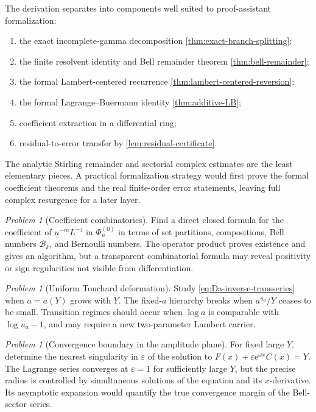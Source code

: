 \documentclass[11pt]{article}
\numberwithin{equation}{section}
\theoremstyle{mainthm}
\theoremstyle{defstyle}
\theoremstyle{remark}
\newtheorem{problem}[theorem]{Problem}
\newcommand{\e}{\mathrm e}
\newcommand{\Bell}{\mathcal B}
\begin{document}
The derivation separates into components well suited to proof-assistant formalization:
\begin{enumerate}
\item the exact incomplete-gamma decomposition \cref{thm:exact-branch-splitting};
\item the finite resolvent identity and Bell remainder theorem \cref{thm:bell-remainder};
\item the formal Lambert-centered recurrence \cref{thm:lambert-centered-reversion};
\item the formal Lagrange--Buermann identity \cref{thm:additive-LB};
\item coefficient extraction in a differential ring;
\item residual-to-error transfer by \cref{lem:residual-certificate}.
\end{enumerate}
The analytic Stirling remainder and sectorial complex estimates are the least elementary pieces.  A practical formalization strategy would first prove the formal coefficient theorems and the real finite-order error statements, leaving full complex resurgence for a later layer.

\begin{problem}[Coefficient combinatorics]
Find a direct closed formula for the coefficient of \(u^{-m}L^{-j}\) in \(\Phi_n^{(0)}\) in terms of set partitions, compositions, Bell numbers \(\Bell_k\), and Bernoulli numbers.  The operator product proves existence and gives an algorithm, but a transparent combinatorial formula may reveal positivity or sign regularities not visible from differentiation.
\end{problem}

\begin{problem}[Uniform Touchard deformation]
Study \cref{eq:Da-inverse-transseries} when \(a=a(Y)\) grows with \(Y\).  The fixed-\(a\) hierarchy breaks when \(a^{u_a}/Y\) ceases to be small.  Transition regimes should occur when \(\log a\) is comparable with \(\log u_a-1\), and may require a new two-parameter Lambert carrier.
\end{problem}

\begin{problem}[Convergence boundary in the amplitude plane]
For fixed large \(Y\), determine the nearest singularity in \(\varepsilon\) of the solution to
\(
 F(x)+\varepsilon\e^{\omega x}C(x)=Y
\).
The Lagrange series converges at \(\varepsilon=1\) for sufficiently large \(Y\), but the precise radius is controlled by simultaneous solutions of the equation and its \(x\)-derivative.  Its asymptotic expansion would quantify the true convergence margin of the Bell-sector series.
\end{problem}
\end{document}
